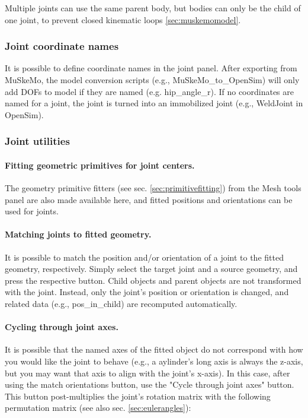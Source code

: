 \documentclass{article}
\begin{document}
Multiple joints can use the same parent body, but bodies can only be the child of one joint, to prevent closed kinematic loops \ref{sec:muskemomodel}.

\subsubsection*{Joint coordinate names}

It is possible to define coordinate names in the joint panel. After exporting from MuSkeMo, the model conversion scripts (e.g., MuSkeMo\_to\_OpenSim) will only add DOFs to model if they are named (e.g. hip\_angle\_r). If no coordinates are named for a joint, the joint is turned into an immobilized joint (e.g., WeldJoint in OpenSim). 

\subsubsection{Joint utilities}
\label{sec:jointutilities}
\paragraph {Fitting geometric primitives for joint centers.} The geometry primitive fitters (see sec. \ref{sec:primitivefitting}) from the Mesh tools panel are also made available here, and fitted positions and orientations can be used for joints.

\paragraph {Matching joints to fitted geometry.} 

It is possible to match the position and/or orientation of a joint to the fitted geometry, respectively. Simply select the target joint and a source geometry, and press the respective button. Child objects and parent objects are not transformed with the joint. Instead, only the joint's position or orientation is changed, and related data (e.g., pos\_in\_child) are recomputed automatically. 

\paragraph {Cycling through joint axes.} 
It is possible that the named axes of the fitted object do not correspond with how you would like the joint to behave (e.g., a aylinder's long axis is always the z-axis, but you may want that axis to align with the joint's x-axis). In this case, after using the match orientations button, use the "Cycle through joint axes" button. This button post-multiplies the joint's rotation matrix with the following permutation matrix (see also sec. \ref{sec:eulerangles}):
\end{document}
